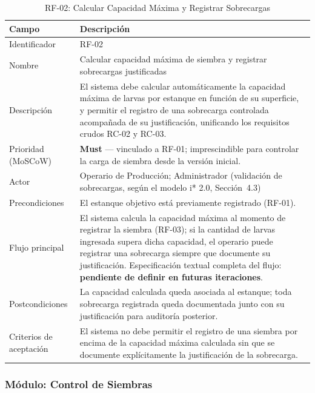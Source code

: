 \documentclass[12pt,a4paper]{article}
\begin{document}
\begin{table}[H]
\centering
\caption{RF-02: Calcular Capacidad Máxima y Registrar Sobrecargas}
\begin{tabular}{|p{3.6cm}|p{10.4cm}|}
\hline
\textbf{Campo} & \textbf{Descripción} \\
\hline
Identificador & RF-02 \\ \hline
Nombre & Calcular capacidad máxima de siembra y registrar sobrecargas
justificadas \\ \hline
Descripción & El sistema debe calcular automáticamente la capacidad máxima de
larvas por estanque en función de su superficie, y permitir el registro de una
sobrecarga controlada acompañada de su justificación, unificando los
requisitos crudos RC-02 y RC-03. \\ \hline
Prioridad (MoSCoW) & \textbf{Must} --- vinculado a RF-01; imprescindible para
controlar la carga de siembra desde la versión inicial. \\ \hline
Actor & Operario de Producción; Administrador (validación de sobrecargas,
según el modelo i* 2.0, Sección~4.3) \\ \hline
Precondiciones & El estanque objetivo está previamente registrado (RF-01). \\ \hline
Flujo principal & El sistema calcula la capacidad máxima al momento de
registrar la siembra (RF-03); si la cantidad de larvas ingresada supera dicha
capacidad, el operario puede registrar una sobrecarga siempre que documente su
justificación. Especificación textual completa del flujo:
\textbf{pendiente de definir en futuras iteraciones}. \\ \hline
Postcondiciones & La capacidad calculada queda asociada al estanque; toda
sobrecarga registrada queda documentada junto con su justificación para
auditoría posterior. \\ \hline
Criterios de aceptación & El sistema no debe permitir el registro de una
siembra por encima de la capacidad máxima calculada sin que se documente
explícitamente la justificación de la sobrecarga. \\ \hline
\end{tabular}
\end{table}

\subsubsection{Módulo: Control de Siembras}
\end{document}
